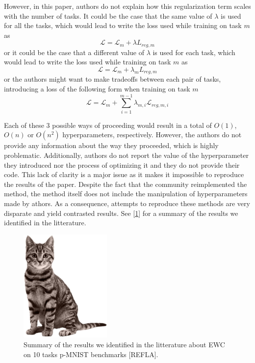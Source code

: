 \documentclass[11pt]{article}
\begin{document}
\vspace{1mm}
\noindent
However, in this paper, authors do not explain how this regularization term scales with the number of tasks. It could be the case that the same value of $\lambda$ is used for all the tasks, which would lead to write the loss used while training on task $m$ as 
\begin{equation}
    \mathcal{L} = \mathcal{L}_{m} + \lambda{L}_{reg,m}
\end{equation}
or it could be the case that a different value of $\lambda$ is used for each task, which would lead to write the loss used while training on task $m$ as
\begin{equation}
    \mathcal{L} = \mathcal{L}_{m} + \lambda_{m}{L}_{reg,m}
\end{equation}
or the authors might want to make tradeoffs between each pair of tasks, introducing a loss of the following form when training on task $m$
\begin{equation}
    \mathcal{L} = \mathcal{L}_{m} + \sum_{i=1}^{m-1}\lambda_{m,i}\mathcal{L}_{reg,m,i}
\end{equation}

\vspace{1mm}
\noindent
Each of these $3$ possible ways of proceeding would result in a total of $O(1)$, $O(n)$ or $O(n^2)$ hyperparameters, respectively. However, the authors do not provide any information about the way they proceeded, which is highly problematic. Additionally, authors do not report the value of the hyperparameter they introduced nor the process of optimizing it and they do not provide their code. This lack of clarity is a major issue as it makes it impossible to reproduce the results of the paper. Despite the fact that the community reimplemented the method, the method itself does not include the manipulation of hyperparameters made by athors. As a consequence, attempts to reproduce these methods are very disparate and yield contrasted results. See [\ref{fig:EWCs}] for a summary of the results we identified in the litterature.

\begin{figure}
    \centering
    \includegraphics[width=0.40\textwidth]{images/cat.jpg}
    \caption{Summary of the results we identified in the litterature about EWC on 10 tasks p-MNIST benchmarks [REFLA].}
    \label{fig:EWCs}
\end{figure}
\end{document}
